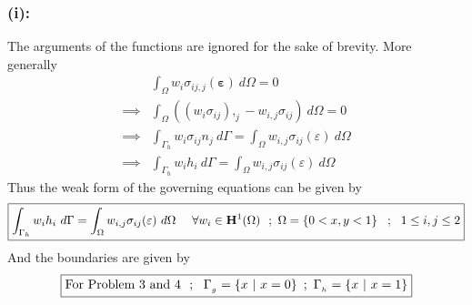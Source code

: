 \subsubsection*{(i): }
The arguments of the functions are ignored for the sake of brevity. More generally 
\begin{align*}
& \int_{\Omega} w_i\sigma_{ij,j}({\bm\varepsilon})\ d\Omega = 0\\
\implies & \int_{\Omega} ((w_i\sigma_{ij}),_{j} - w_{i,j}\sigma_{ij})\ d\Omega = 0\\
\implies & \int_{\Gamma_h} w_i\sigma_{ij}n_j\ d\Gamma = \int_{\Omega} w_{i,j}\sigma_{ij}(\varepsilon)\ d\Omega\\
\implies & \int_{\Gamma_h} w_ih_i\ d\Gamma = \int_{\Omega} w_{i,j}\sigma_{ij}(\varepsilon)\ d\Omega
\end{align*}
Thus the weak form of the governing equations can be given by
\begin{align}
\boxed{\int_{\Gamma_h} w_ih_i\ d\Gamma = \int_{\Omega} w_{i,j}\sigma_{ij}(\varepsilon)\ d\Omega\ \ \ \ \forall w_i \in {\bf H}^1(\Omega)\ \ ;\ \Omega = \left\{ 0 < x,y < 1\right\}\ 
\ ; \ \ 1 \leq i,j \leq 2}
\end{align}
And the boundaries are given by
\begin{align*}
\boxed{{\bf\text{For Problem 3 and 4 }}\ ;\ \ \Gamma_{_g} = \left\{ x\ |\ x = 0\right\}\ ; \ \Gamma_{_h} = \left\{ x \ |\  x = 1\right\}}
\end{align*}
